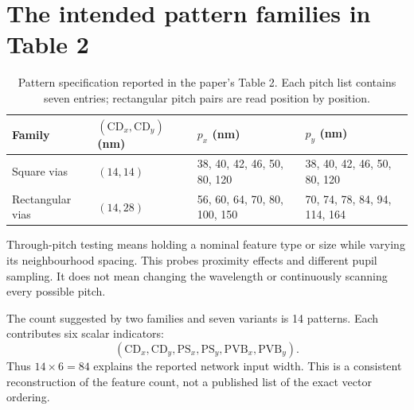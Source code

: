 \section{The intended pattern families in Table 2}
\begin{table}[htbp]\centering\small
\caption{Pattern specification reported in the paper's Table 2.
Each pitch list contains seven entries; rectangular pitch pairs are
read position by position.}
\begin{tabularx}{\textwidth}{@{}L{.22\textwidth}L{.14\textwidth}Y Y@{}}
\toprule Family & $(\mathrm{CD}_x,\mathrm{CD}_y)$ (nm)
& $p_x$ (nm) & $p_y$ (nm)\\ \midrule
Square vias & $(14,14)$ & 38, 40, 42, 46, 50, 80, 120
& 38, 40, 42, 46, 50, 80, 120\\
Rectangular vias & $(14,28)$ & 56, 60, 64, 70, 80, 100, 150
& 70, 74, 78, 84, 94, 114, 164\\
\bottomrule
\end{tabularx}
\end{table}
Through-pitch testing means holding a nominal feature type or size while
varying its neighbourhood spacing. This probes proximity effects and
different pupil sampling. It does not mean changing the wavelength or
continuously scanning every possible pitch.

The count suggested by two families and seven variants is 14 patterns.
Each contributes six scalar indicators:
\[
(\mathrm{CD}_x,\mathrm{CD}_y,\mathrm{PS}_x,\mathrm{PS}_y,
\mathrm{PVB}_x,\mathrm{PVB}_y).
\]
Thus $14\times6=84$ explains the reported network input width.
This is a consistent reconstruction of the feature count, not a
published list of the exact vector ordering.

